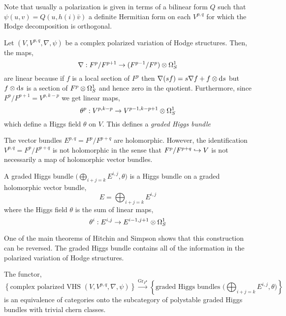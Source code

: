 \documentclass[12pt]{article}
\begin{document}
\begin{rmk}
Note that usually a polarization is given in terms of a bilinear form $Q$ such that $\psi(u,v) = Q(u,h(i) \bar{v})$ a definite Hermitian form on each $V^{p,q}$ for which the Hodge decomposition is orthogonal.
\end{rmk}

\begin{prop}
Let $(V, V^{p,q}, \nabla, \psi)$ be a complex polarized variation of Hodge structures. Then, the maps,
\[ \nabla : F^p / F^{p+1} \to (F^{p-1} / F^{p}) \otimes \Omega^1_S \] 
are linear because if $f$ is a local section of $F^p$ then $\nabla(sf) = s \nabla f + f \otimes \mathrm{d}{s}$ but $f \otimes \mathrm{d}{s}$ is a section of $F^p \otimes \Omega_S^1$ and hence zero in the quotient. Furthermore, since $F^p / F^{p+1} = V^{p,k-p}$ we get linear maps,
\[ \theta^p : V^{p,k-p} \to V^{p-1,k-p+1} \otimes \Omega^1_S \]
which define a Higgs field $\theta$ on $V$. This defines a \textit{graded Higgs bundle} 
\end{prop}

\begin{rmk}
The vector bundles $E^{p,q} = F^p / F^{p+q}$ are holomorphic. However, the identification $V^{p,q} = F^p / F^{p+q}$ is not holomorphic in the sense that $F^p / F^{p+q} \hookrightarrow V$ is not necessarily a map of holomorphic vector bundles.
\end{rmk}


\begin{defn}
A graded Higgs bundle $\big( \bigoplus\limits_{i+j = k} E^{i,j}, \theta \big)$ is a Higgs bundle on a graded holomorphic vector bundle,
\[ E = \bigoplus_{i + j = k} E^{i,j} \]
where the Higgs field $\theta$ is the sum of linear maps,
\[ \theta^i : E^{i,j} \to E^{i-1,j+1} \otimes \Omega^1_S \]
\end{defn}


One of the main theorems of Hitchin and Simpson shows that this construction can be reversed. The graded Higgs bundle contains all of the information in the polarized variation of Hodge structures. 

\begin{theorem}
The functor,
\[ \left\{ \text{complex polarized VHS } (V, V^{p,q}, \nabla, \psi) \right\} \xrightarrow{\mathrm{Gr}_{F^\bullet}} \left\{ \text{graded Higgs bundles } \big( \bigoplus_{i+j = k} E^{i,j}, \theta \big) \right\} \]
is an equivalence of categories onto the subcategory of polystable graded Higgs bundles with trivial chern classes.
\end{theorem}
\end{document}
